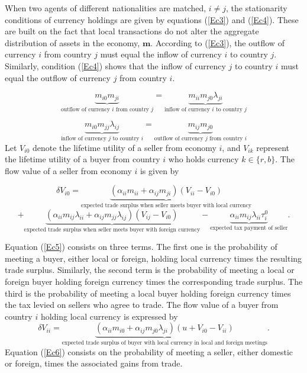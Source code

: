 When two agents of different nationalities are matched, $i \neq j$, the stationarity conditions of currency holdings are given by equations (\ref{Ec3}) and (\ref{Ec4}). These are built on the fact that local transactions do not alter the aggregate distribution of assets in the economy, $\textbf{m}$. According to (\ref{Ec3}), the outflow of currency $i$ from country $j$ must equal the inflow of currency $i$ to country $j$. Similarly, condition (\ref{Ec4}) shows that the inflow of currency $j$ to country $i$ must equal the outflow of currency $j$ from country $i$.

\[
    \underbrace{m_{i0}m_{ji}}_\text{outflow of currency $i$ from country $j$} =
    \underbrace{m_{ii}m_{j0}\lambda_{ji}}_\text{inflow of currency $i$ to country $j$} \tag{3} \label{Ec3}
\]

\[
    \underbrace{m_{i0}m_{jj}\lambda_{ij}}_\text{inflow of currency $j$ to country $i$} =
    \underbrace{m_{ij}m_{j0}}_\text{outflow of currency $j$ from country $i$} \tag{4} \label{Ec4}
\]
Let $V_{i0}$ denote the lifetime utility of a seller from economy $i$, and $V_{ik}$ represent the lifetime utility of a buyer from country $i$ who holds currency $k \in \{r,b\}$. The flow value of a seller from economy $i$ is given by

\[
    \delta V_{i0}  = \underbrace{(\alpha_{ii}m_{ii}+\alpha_{ij}m_{ji})(V_{ii}-V_{i0})}_\text{expected trade surplus when seller meets buyer with local currency} \tag{5} \label{Ec5}
\]
\[
    + \underbrace{(\alpha_{ii}m_{ij}\lambda_{ii}+\alpha_{ij}m_{jj}\lambda_{ij})(V_{ij}-V_{i0})}_\text{expected trade surplus when seller meets buyer with foreign currency} -  \underbrace{\alpha_{ii}m_{ij}\lambda_{ii}\tau^{0}_{i}}_\text{expected tax payment of seller}. 
\]

Equation (\ref{Ec5}) consists on three terms. The first one is the probability of meeting a buyer, either local or foreign, holding local currency times the resulting trade surplus. Similarly, the second term is the probability of meeting a local or foreign buyer holding foreign currency times the corresponding trade surplus. The third is the probability of meeting a local buyer holding foreign currency times the tax levied on sellers who agree to trade.
The flow value of a buyer from country $i$ holding local currency is expressed by
\[
    \delta V_{ii}  =  \underbrace{(\alpha_{ii}m_{i0}+\alpha_{ij}m_{j0}\lambda_{ji})(u+ V_{i0}-V_{ii})}_\text{expected trade surplus of buyer with local currency in local and foreign meetings} \tag{6} \label{Ec6}.
\]
Equation (\ref{Ec6}) consists on the probability of meeting a seller, either domestic or foreign, times the associated gains from trade.


